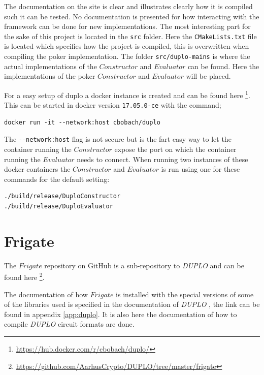 \documentclass[twoside,11pt,openright]{report}
\newcommand{\DUPLO}{\textit{DUPLO} }
\begin{document}
\begin{appendices}
The documentation on the site is clear and illustrates clearly how it is compiled such it can be tested. No documentation is presented for how interacting with the framework can be done for new implementations. The most interesting part for the sake of this project is located in the \verb|src| folder. Here the \verb|CMakeLists.txt| file is located which specifies how the project is compiled, this is overwritten when compiling the poker implementation. The folder \verb|src/duplo-mains| is where the actual implementations of the $Constructor$ and $Evaluator$ can be found. Here the implementations of the poker $Constructor$ and $Evaluator$ will be placed.

\bigskip

For a easy setup of duplo a docker instance is created and can be found here \footnote{\url{https://hub.docker.com/r/cbobach/duplo/}}. This can be started in docker version \verb|17.05.0-ce| with the command;

\begin{center}
\begin{verbatim}
docker run -it --network:host cbobach/duplo
\end{verbatim}
\end{center}

The \verb|--network:host| flag is not secure but is the fart easy way to let the container running the $Constructor$ expose the port on which the container running the $Evaluator$ needs to connect. When running two instances of these docker containers the $Constructor$ and $Evaluator$ is run using one for these commands for the default setting:

\begin{center}
\begin{verbatim}
./build/release/DuploConstructor 
./build/release/DuploEvaluator
\end{verbatim}
\end{center}


\section{Frigate}
\label{app:frigate}
The $Frigate$ repository on GitHub is a sub-repository to \DUPLO and can be found here \footnote{\url{https://github.com/AarhusCrypto/DUPLO/tree/master/frigate}}.

The documentation of how $Frigate$ is installed with the special versions of some of the libraries used is specified in the documentation of \DUPLO, the link can be found in appendix \ref{app:duplo}. It is also here the documentation of how to compile \DUPLO circuit formats are done.


\end{appendices}
\end{document}
